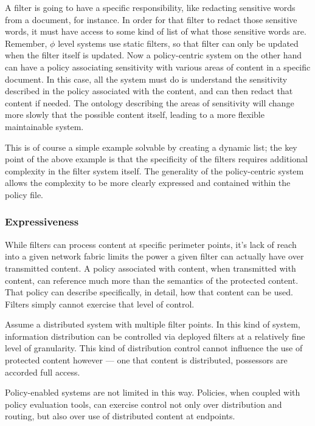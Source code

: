 A filter is going to have a specific responsibility, like redacting sensitive words from a document, for instance.  In order for that filter to redact those sensitive words, it must have access to some kind of list of what those sensitive words are.  Remember, $\phi$ level systems use static filters, so that filter can only be updated when the filter itself is updated.  Now a policy-centric system on the other hand can have a policy associating sensitivity with various areas of content in a specific document.  In this case, all the system must do is understand the sensitivity described in the policy associated with the content, and can then redact that content if needed.  The ontology describing the areas of sensitivity will change more slowly that the possible content itself, leading to a more flexible maintainable system.

This is of course a simple example solvable by creating a dynamic list; the key point of the above example is that the specificity of the filters requires additional complexity in the filter system itself.  The generality of the policy-centric system allows the complexity to be more clearly expressed and contained within the policy file.

\subsubsection*{Expressiveness}
While filters can process content at specific perimeter points, it's lack of reach into a given network fabric limits the power a given filter can actually have over transmitted content.  A policy associated with content, when transmitted with content, can reference much more than the semantics of the protected content.  That policy can describe specifically, in detail, how that content can be used.  Filters simply cannot exercise that level of control.

Assume a distributed system with multiple filter points.  In this kind of system, information distribution can be controlled via deployed filters at a relatively fine level of granularity.  This kind of distribution control cannot influence the use of protected content however --- one that content is distributed, possessors are accorded full access.

Policy-enabled systems are not limited in this way.  Policies, when coupled with policy evaluation tools, can exercise control not only over distribution and routing, but also over use of distributed content at endpoints.

